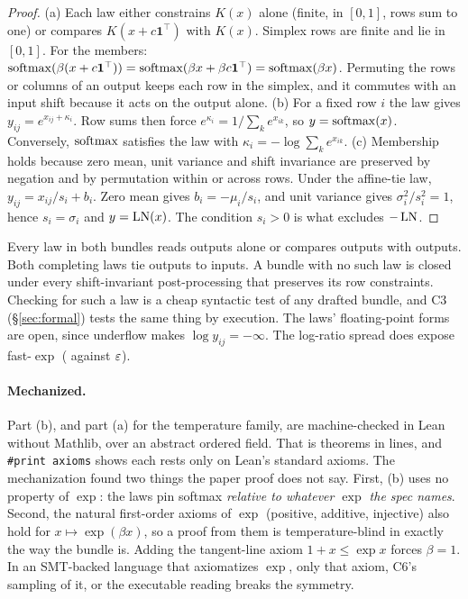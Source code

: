 \begin{proof}
(a) Each law either constrains $K(x)$ alone (finite, in $[0,1]$, rows sum to one) or
compares $K(x + c\mathbf 1^\top)$ with $K(x)$. Simplex rows are finite and lie in
$[0,1]$. For the members: $\operatorname{softmax}(\beta(x + c\mathbf 1^\top)) = \operatorname{softmax}(\beta x +
\beta c\mathbf 1^\top) = \operatorname{softmax}(\beta x)$. Permuting the rows or columns of an output
keeps each row in the simplex, and it commutes with an input shift because it acts on
the output alone.
(b) For a fixed row $i$ the law gives $y_{ij} = e^{x_{ij} + \kappa_i}$. Row sums then
force $e^{\kappa_i} = 1/\sum_k e^{x_{ik}}$, so $y = \operatorname{softmax}(x)$. Conversely, $\operatorname{softmax}$
satisfies the law with $\kappa_i = -\log\sum_k e^{x_{ik}}$.
(c) Membership holds because zero mean, unit variance and shift invariance are preserved by
negation and by permutation within or across rows. Under the affine-tie law,
$y_{ij} = x_{ij}/s_i + b_i$. Zero mean gives $b_i = -\mu_i/s_i$, and unit variance gives
$\sigma_i^2 / s_i^2 = 1$, hence $s_i = \sigma_i$ and $y = \operatorname{LN}(x)$. The condition $s_i > 0$ is
what excludes $-\operatorname{LN}$.
\end{proof}

\begin{remark}
Every law in both bundles reads outputs alone or compares outputs with outputs. Both
completing laws tie outputs to inputs. A bundle with no such law is closed under every
shift-invariant post-processing that preserves its row constraints. Checking for such a
law is a cheap syntactic test of any drafted bundle, and C3 (\S\ref{sec:formal})
tests the same thing by execution. The laws' floating-point forms are open, since
underflow makes $\log y_{ij} = -\infty$. The log-ratio spread does expose fast-$\exp$
(\spreadFastExp{} against \spreadExact{} $\varepsilon$).
\end{remark}

\paragraph{Mechanized.}
Part (b), and part (a) for the temperature family, are machine-checked in
Lean~\leanVersion{} without Mathlib, over an abstract ordered field. That is
\leanTheorems{} theorems in \leanLines{} lines, and \texttt{\#print axioms} shows each
rests only on Lean's standard axioms. The mechanization found two things the paper proof
does not say. First, (b) uses no property of $\exp$: the laws pin softmax \emph{relative
to whatever $\exp$ the spec names}. Second, the \expAxioms{} natural first-order axioms
of $\exp$ (positive, additive, injective) also hold for $x \mapsto \exp(\beta x)$, so a
proof from them is temperature-blind in exactly the way the bundle is. Adding the
tangent-line axiom $1 + x \le \exp x$ forces $\beta = 1$. In an SMT-backed language that
axiomatizes $\exp$, only that axiom, C6's sampling of it, or the executable reading
breaks the symmetry.

